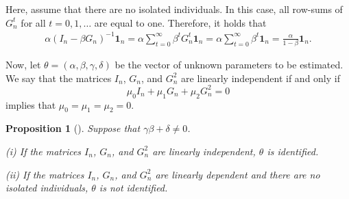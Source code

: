 \documentclass[10.5pt, A4paper, openany, uplatex]{book}
\newtheorem{proposition}[theorem]{Proposition}
{\theorembodyfont{\upshape}
\newtheorem{remark}{Remark}
}
\numberwithin{equation}{section}
\begin{document}
Here, assume that there are no isolated individuals.
In this case, all row-sums of $G_n^t$ for all $t = 0, 1, \ldots$ are equal to one.
Therefore, it holds that
\begin{align}\label{eq:intercept}
	\alpha  (I_n - \beta G_n)^{-1} \mathbf{1}_n 
	= \alpha \sum_{t = 0}^\infty \beta^t G_n^t \mathbf{1}_n 
	= \alpha  \sum_{t = 0}^\infty \beta^t \mathbf{1}_n  = \frac{\alpha}{1 - \beta}\mathbf{1}_n .
\end{align}
\bigskip

Now, let $\theta = (\alpha, \beta, \gamma, \delta)$ be the vector of unknown parameters to be estimated.
We say that the matrices $I_n$, $G_n$, and $G_n^2$ are linearly independent if and only if
\[
	\mu_0 I_n + \mu_1 G_n + \mu_2 G_n^2 = 0
\]
implies that $\mu_0 = \mu_1 = \mu_2 = 0$.
\begin{proposition}[\cite{bramoulle2009identification}]\label{prop:bra}
	Suppose that $\gamma \beta + \delta \neq 0$.
	
	(i)  If the matrices $I_n$, $G_n$, and $G_n^2$ are linearly independent, $\theta$  is identified.
	
	(ii) If the matrices $I_n$, $G_n$, and $G_n^2$ are linearly dependent and there are no isolated individuals, $\theta$ is not identified.
\end{proposition}
\end{document}
